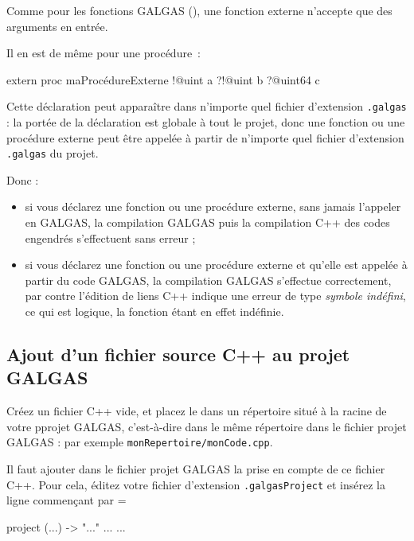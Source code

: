 Comme pour les fonctions GALGAS (), une fonction externe n'accepte que des arguments en entrée.

Il en est de même pour une procédure~:
\begin{galgas3}
extern proc maProcédureExterne !@uint a ?!@uint b ?@uint64 c
\end{galgas3}

Cette déclaration peut apparaître dans n'importe quel fichier d'extension \texttt{.galgas} : la portée de la déclaration est globale à tout le projet, donc une fonction ou une procédure externe peut être appelée à partir de n'importe quel fichier d'extension \texttt{.galgas} du projet.

Donc :
\begin{itemize}
  \item si vous déclarez une fonction ou une procédure externe, sans jamais l'appeler en GALGAS, la compilation GALGAS puis la compilation C++ des codes engendrés s'effectuent sans erreur ;
  \item si vous déclarez  une fonction ou une procédure externe et qu'elle est appelée à partir du code GALGAS, la compilation GALGAS s'effectue correctement, par contre l'édition de liens C++ indique une erreur de type \emph{symbole indéfini}, ce qui est logique, la fonction étant en effet indéfinie.
\end{itemize}








\subsection{Ajout d'un fichier source C++ au projet GALGAS}


Créez un fichier C++ vide, et placez le dans un répertoire situé à la racine de votre pprojet GALGAS, c'est-à-dire dans le même répertoire dans le fichier projet GALGAS : par exemple \texttt{monRepertoire/monCode.cpp}.

Il faut ajouter dans le fichier projet GALGAS la prise en compte de ce fichier C++. Pour cela, éditez votre fichier d'extension \texttt{.galgasProject} et insérez la ligne commençant par \ggst=%

\begin{galgas3}
project (...) -> "..." {
  ...
  ...
}
\end{galgas3}

